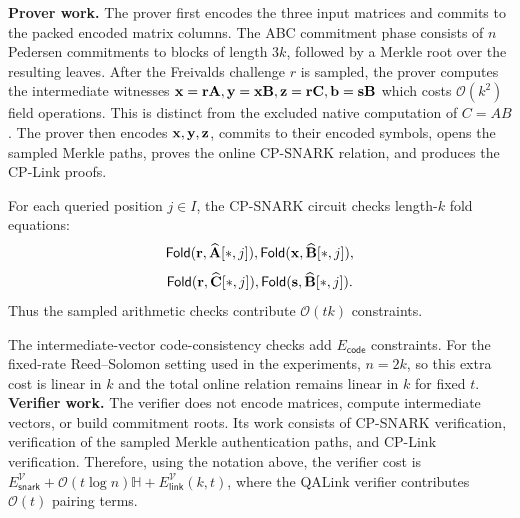 \noindent\textbf{Prover work.}
The prover first encodes the three input matrices and commits to the packed
encoded matrix columns.  The ABC commitment phase consists of \(n\) Pedersen
commitments to blocks of length \(3k\), followed by a Merkle root over
the resulting leaves.  After the Freivalds challenge \(r\) is sampled, the
prover computes the intermediate witnesses
  $\mathbf{x}=\mathbf{r}\mathbf{A},
  \mathbf{y}=\mathbf{x}\mathbf{B},
  \mathbf{z}=\mathbf{r}\mathbf{C},
  \mathbf{b}=\mathbf{s}\mathbf{B}$
which costs \(\mathcal{O}(k^2)\) field operations.  This is distinct from the
excluded native computation of \(C=AB\).  The prover then encodes
\(\mathbf{x},\mathbf{y},\mathbf{z}\), commits to their encoded symbols, opens the
sampled Merkle paths, proves the online CP-SNARK relation, and produces the
CP-Link proofs.

For each queried position \(j\in I\), the CP-SNARK circuit checks 
length-\(k\) fold equations:
\[
  \textsf{Fold}(\mathbf{r},\widehat{\mathbf{A}}[*,j]),
  \textsf{Fold}(\mathbf{x},\widehat{\mathbf{B}}[*,j]),
\]
\[
\textsf{Fold}(\mathbf{r},\widehat{\mathbf{C}}[*,j]),
  \textsf{Fold}(\mathbf{s},\widehat{\mathbf{B}}[*,j]).
\]
Thus the sampled arithmetic checks contribute \(\mathcal{O}(tk)\) constraints. 

The intermediate-vector code-consistency checks add
\(E_{\mathsf{code}}\) constraints. For the fixed-rate
Reed--Solomon setting used in the experiments, \(n=2k\), so this extra cost is
linear in \(k\) and the total online relation remains linear in \(k\) for fixed
\(t\). \\

\noindent\textbf{Verifier work.}
The verifier does not encode matrices, compute intermediate vectors, or build
commitment roots.  Its work consists of CP-SNARK verification, verification of
the sampled Merkle authentication paths, and CP-Link verification.  Therefore,
using the notation above, the verifier cost is
$E_{\mathsf{snark}}^\mathcal{V} + \mathcal{O}(t\log n)\mathbb{H} +
E_{\mathsf{link}}^\mathcal{V}(k,t)$, where the QALink verifier contributes
\(\mathcal{O}(t)\) pairing terms. \\


